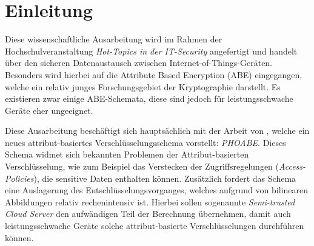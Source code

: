 \section{Einleitung}
Diese wissenschaftliche Ausarbeitung wird im Rahmen der Hochschulveranstaltung
\textit{Hot-Topics in der IT-Security} angefertigt und handelt über den
sicheren Datenaustausch zwischen Internet-of-Things-Geräten.  Besonders wird
hierbei auf die Attribute Based Encryption (ABE) eingegangen, welche ein
relativ junges Forschungsgebiet der Kryptographie darstellt. Es existieren
zwar einige ABE-Schemata, diese sind jedoch für leistungsschwache Geräte eher
ungeeignet.

Diese Ausarbeitung beschäftigt sich hauptsächlich mit der Arbeit von
\cite{phoabe}, welche ein neues attribut-basiertes Verschlüsselungsschema
vorstellt: \textit{PHOABE}. Dieses Schema widmet sich bekannten Problemen der
Attribut-basierten Verschlüsselung, wie zum Beispiel das Verstecken der
Zugriffsregelungen (\textit{Access-Policies}), die sensitive Daten enthalten
können. Zusätzlich fordert das Schema eine Auslagerung des
Entschlüsselungsvorganges, welches aufgrund von bilinearen Abbildungen relativ
rechenintensiv ist. Hierbei sollen sogenannte \textit{Semi-trusted Cloud
Server} den aufwändigen Teil der Berechnung über\-nehmen, damit auch
leistungsschwache Geräte solche attribut-basierte Ver\-schlüs\-sel\-ung\-en
durchführen können.
